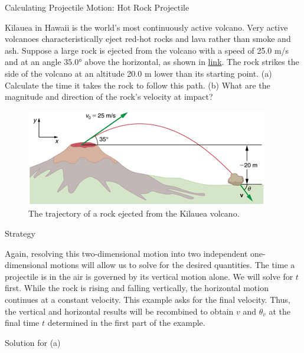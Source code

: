 \documentclass[
]{book}
\newenvironment{tinysection}{}{}
\begin{document}
\hypertarget{fs-id708626}{}
Calculating Projectile Motion: Hot Rock Projectile

Kilauea in Hawaii is the world's most continuously active volcano. Very
active volcanoes characteristically eject red-hot rocks and lava rather
than smoke and ash. Suppose a large rock is ejected from the volcano
with a speed of 25.0 m/s and at an angle \(\text{35.0°}{}\) above the
horizontal, as shown in
\protect\hyperlink{import-auto-id1817519}{link}. The rock strikes
the side of the volcano at an altitude 20.0 m lower than its starting
point. (a) Calculate the time it takes the rock to follow this path. (b)
What are the magnitude and direction of the rock's velocity at impact?

\begin{figure}
\hypertarget{import-auto-id1817519}{%
\centering
\includegraphics{images/Figure_03_04_04a.jpg}
\caption{The trajectory of a rock ejected from the Kilauea
volcano.}\label{import-auto-id1817519}
}
\end{figure}

\begin{tinysection}

{Strategy}

\end{tinysection}

Again, resolving this two-dimensional motion into two independent
one-dimensional motions will allow us to solve for the desired
quantities. The time a projectile is in the air is governed by its
vertical motion alone. We will solve for \(t{}\) first. While the rock is
rising and falling vertically, the horizontal motion continues at a
constant velocity. This example asks for the final velocity. Thus, the
vertical and horizontal results will be recombined to obtain \(v{}\) and
\(\theta_{v}{}\) at the final time \(t{}\) determined in the first part of
the example.

\begin{tinysection}

{Solution for (a)}

\end{tinysection}
\end{document}
